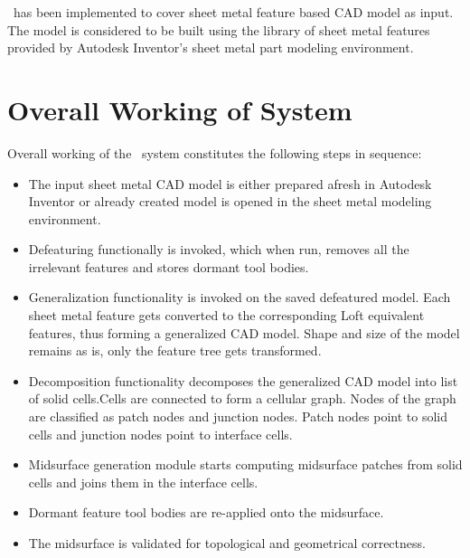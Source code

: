 \mysystemname~has been implemented to cover sheet metal feature based CAD model as input. The model is considered to be built using the library of sheet metal features provided by Autodesk Inventor's sheet metal part modeling environment.



\section{Overall Working of System} \label{sec:proposal:scope}

Overall working of the \mysystemname~system constitutes the following steps in sequence:
\begin{itemize}
\item The input sheet metal CAD model is either prepared afresh in Autodesk Inventor or already created model is opened in the sheet metal modeling environment.
\item Defeaturing functionally is invoked, which when run, removes all the irrelevant features and stores dormant tool bodies. 
\item Generalization functionality is invoked on the saved defeatured model. Each sheet metal feature gets converted to the corresponding Loft equivalent features, thus forming a generalized CAD model. Shape and size of the model remains as is, only the feature tree gets transformed.
\item Decomposition functionality decomposes the generalized CAD model into list of solid cells.Cells are connected to form a cellular graph. Nodes of the graph are classified as patch nodes and junction nodes. Patch nodes point to solid cells and junction nodes point to interface cells.
\item Midsurface generation module starts computing midsurface patches from solid cells and joins them in the interface cells.
\item Dormant feature tool bodies are re-applied onto the midsurface.
\item The midsurface is validated for topological and geometrical correctness.
\end{itemize}


